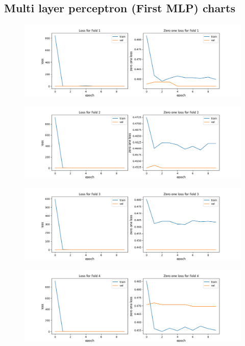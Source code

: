 \begin{appendices}
\chapter{Multi layer perceptron (First MLP) charts}
\begin{figure}[hbtp]

\centering
\includegraphics[scale=0.5]{../Images/mlp01_fold_1_zeroplot.png}
\end{figure}
\begin{figure}[hbtp]

\centering
\includegraphics[scale=0.5]{../Images/mlp01_fold_2_zeroplot.png}
\end{figure}
\begin{figure}[hbtp]

\centering
\includegraphics[scale=0.5]{../Images/mlp01_fold_3_zeroplot.png}
\end{figure}
\begin{figure}[hbtp]

\centering
\includegraphics[scale=0.5]{../Images/mlp01_fold_4_zeroplot.png}
\end{figure}
\begin{figure}[hbtp]


\end{figure}
\end{appendices}

